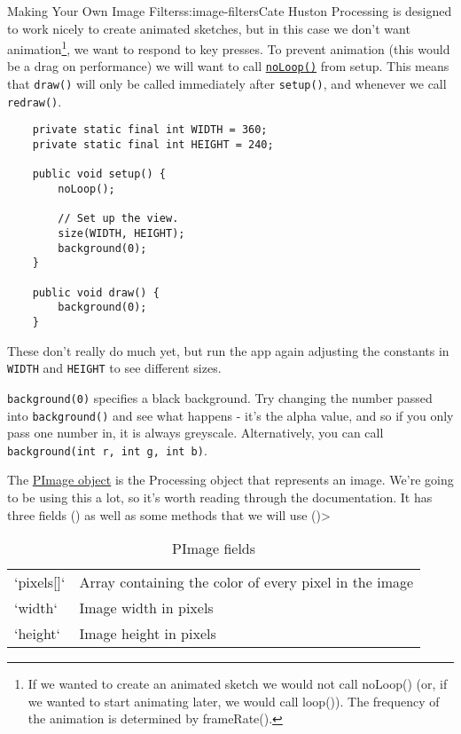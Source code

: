 \begin{aosachapter}{Making Your Own Image Filters}{s:image-filters}{Cate Huston}
Processing is designed to work nicely to create animated sketches, but
in this case we don't want animation\footnote{If we wanted to create an
  animated sketch we would not call noLoop() (or, if we wanted to start
  animating later, we would call loop()). The frequency of the animation
  is determined by frameRate().}, we want to respond to key presses. To
prevent animation (this would be a drag on performance) we will want to
call
\href{http://www.processing.org/reference/noLoop_.html}{\texttt{noLoop()}}
from setup. This means that \texttt{draw()} will only be called
immediately after \texttt{setup()}, and whenever we call
\texttt{redraw()}.

\begin{verbatim}
    private static final int WIDTH = 360;
    private static final int HEIGHT = 240;

    public void setup() {
        noLoop();

        // Set up the view.
        size(WIDTH, HEIGHT);
        background(0);
    }
        
    public void draw() {
        background(0);
    }
\end{verbatim}

These don't really do much yet, but run the app again adjusting the
constants in \texttt{WIDTH} and \texttt{HEIGHT} to see different sizes.

\texttt{background(0)} specifies a black background. Try changing the
number passed into \texttt{background()} and see what happens - it's the
alpha value, and so if you only pass one number in, it is always
greyscale. Alternatively, you can call
\texttt{background(int r, int g, int b)}.

\label{pimage}

The \href{http://processing.org/reference/PImage.html}{PImage object} is
the Processing object that represents an image. We're going to be using
this a lot, so it's worth reading through the documentation. It has
three fields () as well as
some methods that we will use
()\textgreater{}

\begin{table}
\centering
{\footnotesize
{}
\begin{tabular}{ll}
\hline
`pixels[]` & Array containing the color of every pixel in the image \\
`width` & Image width in pixels \\
`height` & Image height in pixels \\
\hline
\end{tabular}
}
\caption{PImage fields}
\label{500l.imagefilters.pimagefields}
\end{table}


\end{aosachapter}
